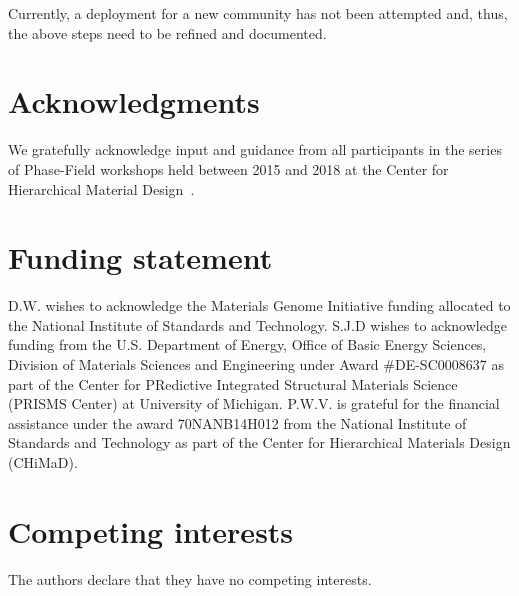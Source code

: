 \documentclass{jors}
\begin{document}
Currently, a deployment for a new community has not been attempted
and, thus, the above steps need to be refined and documented.

\section*{Acknowledgments}

We gratefully acknowledge input and guidance from all participants in
the series of Phase-Field workshops held between 2015 and 2018 at the
Center for Hierarchical Material Design~\cite{workshops}.

\section*{Funding statement}

D.W. wishes to acknowledge the Materials Genome Initiative funding
allocated to the National Institute of Standards and Technology. S.J.D
wishes to acknowledge funding from the U.S. Department of Energy,
Office of Basic Energy Sciences, Division of Materials Sciences and
Engineering under Award \#DE-SC0008637 as part of the Center for
PRedictive Integrated Structural Materials Science (PRISMS Center) at
University of Michigan. P.W.V. is grateful for the financial
assistance under the award 70NANB14H012 from the National Institute of
Standards and Technology as part of the Center for Hierarchical
Materials Design (CHiMaD).

\section*{Competing interests}

The authors declare that they have no competing interests.

\printbibliography
\end{document}
